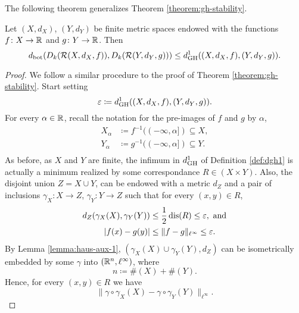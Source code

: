 The following theorem generalizes Theorem \ref{theorem:gh-stability}.

\begin{theorem}
    Let $ (X, d_X) $, $ (Y, d_Y) $ be finite metric spaces endowed with the functions $ f \colon X \to \mathbb R $ and $ g \colon Y \to \mathbb R $. Then
    \begin{equation}
        d_{\operatorname{bot}}(D_k(\mathcal{R}(X, d_X, f)), D_k(\mathcal{R}(Y, d_Y, g))) \leq d_{\operatorname{GH}}^1((X, d_X, f), (Y, d_Y, g)).
    \end{equation}
\end{theorem}
\begin{proof}
    We follow a similar procedure to the proof of Theorem \ref{theorem:gh-stability}. Start setting
    \begin{equation}
        \varepsilon \coloneq d_{\operatorname{GH}}^1((X, d_X, f), (Y, d_Y, g)).
    \end{equation}
    For every $ \alpha \in \mathbb R $, recall the notation for the pre-images of $ f $ and $ g $ by $ \alpha $,
    \begin{align}
        X_\alpha &\coloneq f^{-1}((-\infty, \alpha]) \subseteq X, \\
        Y_\alpha &\coloneq g^{-1}((-\infty, \alpha]) \subseteq Y. \\
    \end{align}
    As before, as $ X $ and $ Y $ are finite, the infimum in $ d_{\operatorname{GH}}^1 $ of Definition \ref{def:dgh1} is actually a minimum realized by some correspondance $ R \in (X \times Y) $. Also, the disjoint union $ Z = X \cup Y $, can be endowed with a metric $ d_Z $ and a pair of inclusions $ \gamma_X \colon X \to Z $, $ \gamma_Y \colon Y \to Z $ such that for every $ (x, y) \in R $, 
    \begin{align}
        d_Z(\gamma_X(X), \gamma_Y(Y)) &\leq \frac{1}{2} \operatorname{dis}(R) \leq \varepsilon, \text{ and} \\
        |f(x) - g(y)| &\leq \|f-g\|_{\ell^\infty} \leq \varepsilon.
    \end{align}
    By Lemma \ref{lemma:haus-aux-1}, $ (\gamma_X(X) \cup \gamma_Y(Y), d_Z) $ can be isometrically embedded by some $ \gamma $ into $ (\mathbb R^n, \ell^\infty) $, where
    \begin{equation}
        n \coloneq \#(X) + \#(Y).
    \end{equation}
    Hence, for every $ (x, y) \in R $ we have
    \begin{equation}
        \|\gamma \circ \gamma_X(X) - \gamma \circ \gamma_Y(Y) \|_{\ell^\infty}.
    \end{equation}


\end{proof}
